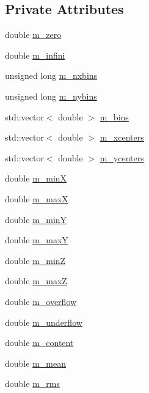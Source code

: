 \subsection*{Private Attributes}
\begin{DoxyCompactItemize}
\item 
double \hyperlink{classHisto2D_a71dfc840fbaa159ef22091312d1ae5d9}{m\+\_\+zero}
\item 
double \hyperlink{classHisto2D_a3763bdf81d08ba44aa56c0e85de95ff3}{m\+\_\+infini}
\item 
unsigned long \hyperlink{classHisto2D_a39a9d29010bf81c546a1ad1b01f7cb43}{m\+\_\+nxbins}
\item 
unsigned long \hyperlink{classHisto2D_afebeb164369fa9cea59f226d71907e3d}{m\+\_\+nybins}
\item 
std\+::vector$<$ double $>$ \hyperlink{classHisto2D_a84f6c03673499f34b981cdebf69d22aa}{m\+\_\+bins}
\item 
std\+::vector$<$ double $>$ \hyperlink{classHisto2D_aa2e8211f89d086e1c0beaf3b7d18c568}{m\+\_\+xcenters}
\item 
std\+::vector$<$ double $>$ \hyperlink{classHisto2D_a2a431c0f22a038482fc8b3913743f08b}{m\+\_\+ycenters}
\item 
double \hyperlink{classHisto2D_a039d7f45ec8b5b84c1d71f8f87884211}{m\+\_\+minX}
\item 
double \hyperlink{classHisto2D_af428efc9b984006eeba1a216f7d15d6d}{m\+\_\+maxX}
\item 
double \hyperlink{classHisto2D_a5bea9523f4ac077b0cc72cc1b28e0834}{m\+\_\+minY}
\item 
double \hyperlink{classHisto2D_a049044e82d008636040c5c8815cac297}{m\+\_\+maxY}
\item 
double \hyperlink{classHisto2D_a6cfa2290ee0d786b37f7ed08129c60e3}{m\+\_\+minZ}
\item 
double \hyperlink{classHisto2D_a82422535a6aeaf911129c91e0e44e603}{m\+\_\+maxZ}
\item 
double \hyperlink{classHisto2D_a7ab17bc811ce4a5b45ab3779cc8e221a}{m\+\_\+overflow}
\item 
double \hyperlink{classHisto2D_ab21996b2788e5d0e78bb611df3584440}{m\+\_\+underflow}
\item 
double \hyperlink{classHisto2D_ab70be93148e5c9b24e48b60c6b3b5f89}{m\+\_\+content}
\item 
double \hyperlink{classHisto2D_a78286e1d11cc657a5fd1bd1f60c8dff9}{m\+\_\+mean}
\item 
double \hyperlink{classHisto2D_a461938b95bb93a810ae7941a181023cc}{m\+\_\+rms}
\end{DoxyCompactItemize}
